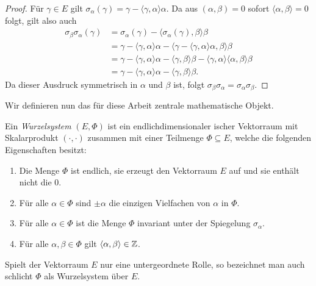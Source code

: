\begin{proof}
  Für $\gamma \in E$ gilt $\sigma_\alpha(\gamma) = \gamma - \langle \gamma, \alpha \rangle \alpha$. Da aus $(\alpha, \beta) = 0$ sofort $\langle \alpha, \beta \rangle = 0$ folgt, gilt also auch
  \begin{align*}
    \sigma_\beta \sigma_\alpha(\gamma) 
    &= \sigma_\alpha(\gamma) - \langle \sigma_\alpha(\gamma), \beta \rangle \beta \\
    &= \gamma - \langle \gamma, \alpha \rangle \alpha 
              - \langle \gamma- \langle \gamma, \alpha\rangle \alpha, \beta \rangle \beta \\
    &= \gamma - \langle \gamma, \alpha \rangle \alpha 
              - \langle \gamma, \beta \rangle \beta - \langle \gamma, \alpha \rangle \langle \alpha, \beta \rangle \beta \\
    &= \gamma - \langle \gamma, \alpha \rangle \alpha - \langle \gamma, \beta \rangle \beta.
  \end{align*} 
  Da dieser Ausdruck symmetrisch in $\alpha$ und $\beta$ ist, folgt $\sigma_\beta \sigma_\alpha = \sigma_\alpha \sigma_\beta$.
\end{proof}

Wir definieren nun das für diese Arbeit zentrale mathematische Objekt.

\begin{defn}
  Ein \emph{Wurzelsystem} $(E,\Phi)$ ist ein endlichdimensionaler \euklid ischer Vektorraum mit Skalarprodukt $(\cdot,\cdot)$ zusammen mit einer Teilmenge $\Phi \subseteq E$, welche die folgenden Eigenschaften besitzt:
  \begin{enumerate}[(R1)]
    \item\label{it:R1} Die Menge $\Phi$ ist endlich, sie erzeugt den Vektorraum $E$ auf und sie enthält nicht die $0$.
    \item\label{it:R2} Für alle $\alpha \in \Phi$ sind $\pm \alpha$ die einzigen Vielfachen von $\alpha$ in $\Phi$.
    \item\label{it:R3} Für alle $\alpha \in \Phi$ ist die Menge $\Phi$ invariant unter der Spiegelung $\sigma_\alpha$.
    \item\label{it:R4} Für alle $\alpha, \beta \in \Phi$ gilt $\langle \alpha, \beta \rangle \in \mathbb{Z}$.
  \end{enumerate}
  Spielt der Vektorraum $E$ nur eine untergeordnete Rolle, so bezeichnet man auch schlicht $\Phi$ als Wurzelsystem über $E$.
\end{defn}

